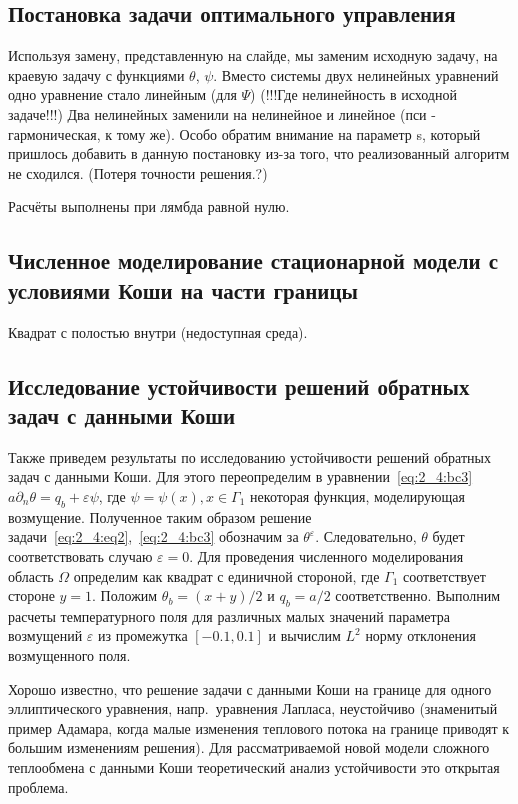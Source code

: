 \documentclass[8pt,a4paper]{article}
\begin{document}
    \vspace{10cm}
    \subsection*{Постановка задачи оптимального управления}
    Используя замену, представленную на слайде, мы заменим исходную задачу, на краевую задачу
    с функциями $\theta$, $\psi$.
    Вместо системы двух нелинейных уравнений одно уравнение стало линейным (для $\Psi$)
    (!!!Где нелинейность в исходной задаче!!!)
    Два нелинейных заменили на нелинейное и линейное (пси - гармоническая, к тому же).
    Особо обратим внимание на параметр s, который пришлось добавить в данную постановку из-за
    того, что реализованный алгоритм не сходился. (Потеря точности решения.?)

    Расчёты выполнены при лямбда равной нулю.

    \vspace{10cm}
    \subsection*{Численное моделирование стационарной модели с условиями Коши на части границы}
    Квадрат с полостью внутри (недоступная среда).

    \vspace{10cm}
    \subsection*{Исследование устойчивости решений обратных задач с данными Коши}
    Также приведем результаты по исследованию устойчивости решений
    обратных задач с данными Коши.
    Для этого переопределим в уравнении~\eqref{eq:2_4:bc3} $a\partial_n \theta = q_b +\varepsilon \psi$,
    где $\psi = \psi(x), x \in \Gamma_1$ некоторая функция, моделирующая возмущение.
    Полученное таким образом решение задачи~\eqref{eq:2_4:eq2},~\eqref{eq:2_4:bc3}
    обозначим за $\theta^{\varepsilon}$.
    Следовательно, $\theta$ будет соответствовать случаю $\varepsilon = 0$.
    Для проведения численного моделирования область $\Omega$ определим
    как квадрат с единичной стороной, где $\Gamma_1$ соответствует стороне $y = 1$.
    Положим $\theta_b = (x + y) / 2$ и $q_b = a / 2$ соответственно.
    Выполним расчеты температурного поля
    для различных малых значений параметра возмущений $\varepsilon$
    из промежутка $[-0.1, 0.1]$ и вычислим $L^2$ норму отклонения возмущенного поля.


    Хорошо известно, что решение задачи с данными
    Коши на границе для одного эллиптического уравнения,
    напр.\ уравнения Лапласа, неустойчиво
    (знаменитый пример Адамара, когда малые изменения
    теплового потока на границе приводят к большим изменениям решения).
    Для рассматриваемой новой модели сложного теплообмена с данными Коши
    теоретический анализ устойчивости это открытая проблема.
\end{document}
